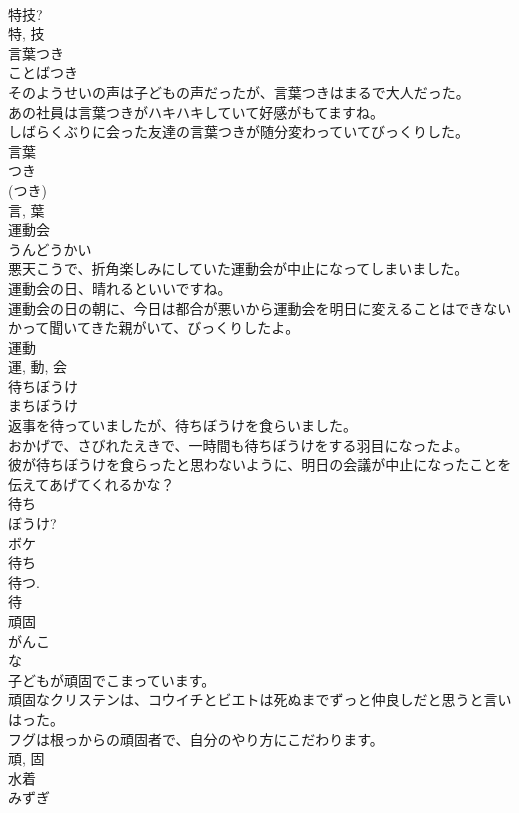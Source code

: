 \documentclass[8pt]{extreport}
\begin{document}
\begin{CJK}{UTF8}{min}
\\	特技?	
\\	特, 技	
\\	言葉つき	
\\	ことばつき	
\\	そのようせいの声は子どもの声だったが、言葉つきはまるで大人だった。	
\\	あの社員は言葉つきがハキハキしていて好感がもてますね。	
\\	しばらくぶりに会った友達の言葉つきが随分変わっていてびっくりした。	
\\	言葉 
\\	つき 
\\	(つき) 
\\	言, 葉	
\\	運動会	
\\	うんどうかい	
\\	悪天こうで、折角楽しみにしていた運動会が中止になってしまいました。	
\\	運動会の日、晴れるといいですね。	
\\	運動会の日の朝に、今日は都合が悪いから運動会を明日に変えることはできないかって聞いてきた親がいて、びっくりしたよ。	
\\	運動 
\\	運, 動, 会	
\\	待ちぼうけ	
\\	まちぼうけ	
\\	返事を待っていましたが、待ちぼうけを食らいました。	
\\	おかげで、さびれたえきで、一時間も待ちぼうけをする羽目になったよ。	
\\	彼が待ちぼうけを食らったと思わないように、明日の会議が中止になったことを伝えてあげてくれるかな？	
\\	待ち 
\\	ぼうけ? 
\\	ボケ 
\\	待ち 
\\	待つ. 
\\	待	
\\	頑固	
\\	がんこ	
\\	な 
\\	子どもが頑固でこまっています。	
\\	頑固なクリステンは、コウイチとビエトは死ぬまでずっと仲良しだと思うと言いはった。	
\\	フグは根っからの頑固者で、自分のやり方にこだわります。	
\\	頑, 固	
\\	水着	
\\	みずぎ	

\end{CJK}
\end{document}
